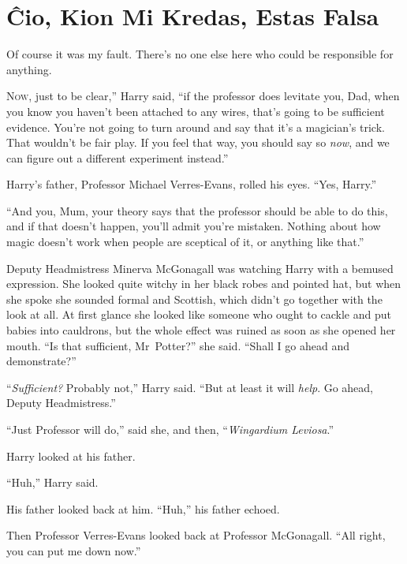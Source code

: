 \chapter{Ĉio, Kion Mi Kredas, Estas Falsa}

\begin{chapterOpeningQuote}
Of course it was my fault.
There’s no one else here who could be responsible for anything.
\end{chapterOpeningQuote}

\lettrine[ante=“]{N}{ow}, just to be clear,” Harry said, “if the professor does levitate you, Dad, when you know you haven’t been attached to any wires, that’s going to be sufficient evidence.
You’re not going to turn around and say that it’s a magician’s trick.
That wouldn’t be fair play.
If you feel that way, you should say so \emph{now}, and we can figure out a different experiment instead.”

Harry’s father, Professor Michael Verres-Evans, rolled his eyes.
“Yes, Harry.”

“And you, Mum, your theory says that the professor should be able to do this, and if that doesn’t happen, you’ll admit you’re mistaken.
Nothing about how magic doesn’t work when people are sceptical of it, or anything like that.”

Deputy Headmistress Minerva McGonagall was watching Harry with a bemused expression.
She looked quite witchy in her black robes and pointed hat, but when she spoke she sounded formal and Scottish, which didn’t go together with the look at all.
At first glance she looked like someone who ought to cackle and put babies into cauldrons, but the whole effect was ruined as soon as she opened her mouth.
“Is that sufficient, Mr~Potter?” she said.
“Shall I go ahead and demonstrate?”

“\emph{Sufficient?} Probably not,” Harry said.
“But at least it will \emph{help}.
Go ahead, Deputy Headmistress.”

“Just Professor will do,” said she, and then, “\emph{Wingardium Leviosa}.”

Harry looked at his father.

“Huh,” Harry said.

His father looked back at him.
“Huh,” his father echoed.

Then Professor Verres-Evans looked back at Professor McGonagall.
“All right, you can put me down now.”

